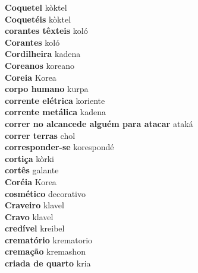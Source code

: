 \textbf{ Coquetel  } kòktel \\
\textbf{ Coquetéis  } kòktel \\
\textbf{ corantes têxteis  } koló \\
\textbf{ Corantes  } koló \\
\textbf{ Cordilheira  } kadena \\
\textbf{ Coreanos  } koreano \\
\textbf{ Coreia  } Korea \\
\textbf{ corpo humano  } kurpa \\
\textbf{ corrente elétrica  } koriente \\
\textbf{ corrente metálica  } kadena \\
\textbf{ correr no alcancede alguém para atacar  } ataká \\
\textbf{ correr terras  } chol \\
\textbf{ corresponder-se  } korespondé \\
\textbf{ cortiça  } kòrki \\
\textbf{ cortês  } galante \\
\textbf{ Coréia  } Korea \\
\textbf{ cosmético  } decorativo \\
\textbf{ Craveiro  } klavel \\
\textbf{ Cravo  } klavel \\
\textbf{ credível  } kreibel \\
\textbf{ crematório  } krematorio \\
\textbf{ cremação  } kremashon \\
\textbf{ criada de quarto  } kria \\
